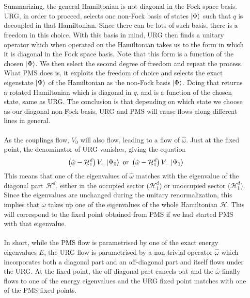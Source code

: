\documentclass[twoside,11pt]{report}
\numberwithin{equation}{section}
\begin{document}
\\\\Summarizing, the general Hamiltonian is not diagonal in the Fock space basis.
URG, in order to proceed, selects one non-Fock basis of states \(\ket{\Phi}\) such that \(q\) is decoupled in that Hamiltonian.
Since there can be lots of such basis, there is a freedom in this choice.
With this basis in mind, URG then finds a unitary operator which when operated on the Hamiltonian takes us to the form in which it is diagonal in the Fock space basis.
Note that this form is a function of the chosen \(\ket{\Phi}\).
We then select the second degree of freedom and repeat the process.
What PMS does is, it exploits the freedom of choice and selects the exact eigenstate \(\ket{\Psi}\) of the Hamiltonian as the non-Fock basis \(\ket{\Phi}\).
Doing that returns a rotated Hamiltonian which is diagonal in \(q\), and is a function of the chosen state, same as URG. The conclusion is that depending on which state we choose as our diagonal non-Fock basis, URG and PMS will cause flows along different lines in general.
\\\\As the couplings flow, \(V_0\) will also flow, leading to a flow of \(\hat\omega\). Just at the fixed point, the denominator of URG vanishes, giving the equation
\begin{equation}\begin{aligned}
	\left(\hat\omega - \mathcal{H}_1^d\right)V_+\ket{\Psi_0} \text{ or } \left(\hat\omega - \mathcal{H}_1^d\right)V_-\ket{\Psi_1}
\end{aligned}\end{equation}
This means that one of the eigenvalues of \(\hat\omega\) matches with the eigenvalue of the diagonal part \(\mathcal{H}^d\), either in the occupied sector (\(\mathcal{H}^d_1\)) or unoccupied sector (\(\mathcal{H}^d_1\)). Since the eigenvalues are unchanged during the unitary renormalization, this implies that \(\omega\) takes up one of the eigenvalues of the whole Hamiltonian \(\mathcal{H}\). This will correspond to the fixed point obtained from PMS if we had started PMS with that eigenvalue.
\\\\In short, while the PMS flow is parametrised by one of the exact energy eigenvalues \(E\), the URG flow is parametrised by a non-trivial operator \(\hat \omega\) which incorporates both a diagonal part and an off-diagonal part and itself flows under the URG. At the fixed point, the off-diagonal part cancels out and the \(\hat\omega\) finally flows to one of the energy eigenvalues and the URG fixed point matches with one of the PMS fixed points.
\end{document}
